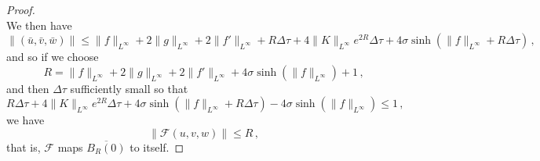 \documentclass[10pt]{amsart}
\newcommand{\cF}{\mathcal{F}}
\begin{document}
\begin{proof}
\begin{equation}
\end{equation}
We then have
\begin{equation}
\| (\bar{u},\bar{v},\bar{w}) \| \leq  \| f \|_{L^\infty} + 2\| g \|_{L^\infty} + 2\| f' \|_{L^\infty} + R \Delta \tau  + 4 \| K \|_{L^\infty} e^{2R} \Delta \tau + 4 \sigma \sinh \left( \| f \|_{L^\infty} + R \Delta \tau \right)  \, ,
\end{equation}
and so if we choose
\begin{equation} \label{sizeofR}
R =  \| f \|_{L^\infty} + 2\| g \|_{L^\infty} + 2\| f' \|_{L^\infty} + 4 \sigma \sinh \left( \| f \|_{L^\infty} \right) + 1 \, ,
\end{equation}
and then $\Delta \tau$ sufficiently small so that
\begin{equation} \label{sizeofdeltatau}
R \Delta \tau  + 4 \| K \|_{L^\infty} e^{2R} \Delta \tau + 4 \sigma \sinh \left( \| f \|_{L^\infty} + R \Delta \tau \right) - 4 \sigma \sinh \left( \| f \|_{L^\infty} \right) \leq 1 \, ,
\end{equation}
we have
\begin{equation}
\| \cF(u,v,w) \| \leq  R  \, ,
\end{equation}
that is, $\cF$ maps $\overline{B_R(0)}$ to itself.


\end{proof}
\end{document}
